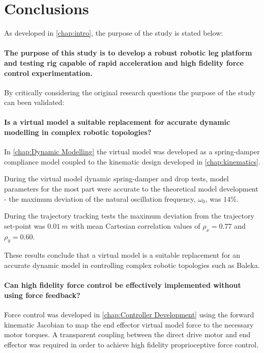 \chapter{Conclusions}

As developed in \cref{chap:intro}, the purpose of the study is stated below:

\subsubsection*{The purpose of this study is to develop a robust robotic leg platform and testing rig capable of rapid acceleration and high fidelity force control experimentation.}

By critically considering the original research questions the purpose of the study can been validated:

\subsubsection*{Is a virtual model a suitable replacement for accurate dynamic modelling in complex robotic topologies?} 

In \cref{chap:Dynamic Modelling} the virtual model was developed as a spring-damper compliance model coupled to the kinematic design developed in \cref{chap:kinematics}. 

During the virtual model dynamic spring-damper and drop tests, model parameters for the most part were accurate to the theoretical model development - the maximum deviation of the natural oscillation frequency, $\omega_0$, was $14\%$. 

During the trajectory tracking tests the maximum deviation from the trajectory set-point was $0.01\ m$ with mean Cartesian correlation values of $\rho_x = 0.77$ and $\rho_y = 0.60$. 

These results conclude that a virtual model is a suitable replacement for an accurate dynamic model in controlling complex robotic topologies such as Baleka.

\subsubsection*{Can high fidelity force control be effectively implemented without using force feedback?}

Force control was developed in \cref{chap:Controller Development} using the forward kinematic Jacobian to map the end effector virtual model force to the necessary motor torques. A transparent coupling between the direct drive motor and end effector was required in order to achieve high fidelity proprioceptive force control. 

